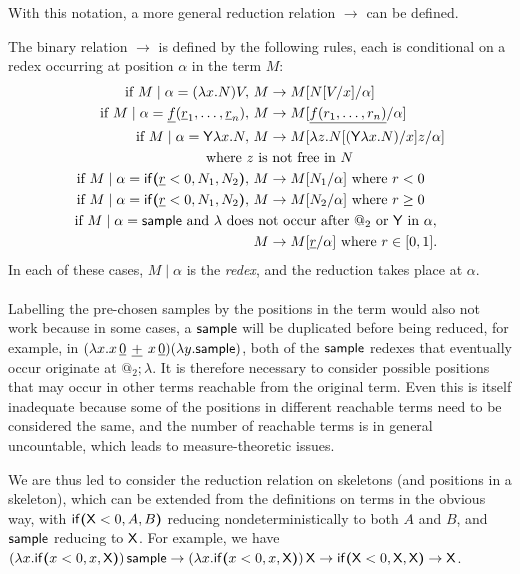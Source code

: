 With this notation, a more general reduction relation $\to$ can be defined.
\begin{definition}
\label{def:more general red}
The binary relation $\to$ is defined by the following rules, each is conditional on a redex occurring at position $\alpha$ in the term $M$:
\begin{align*}
  \text{if } M \mid \alpha = (\lambda x.N) V,\ & M \to M[N[V/x]/\alpha] \\
  \text{if } M \mid \alpha = \underline f (\underline r_1, \dots , \underline r_n),\ & M \to M[\underline{f(r_1,\dots,r_n)}/\alpha] \\
  \text{if } M \mid \alpha = \mathsf{Y} \lambda x. N,\ & M \to M[\lambda z. N[(\mathsf{Y} \lambda x. N)/x] z/\alpha]\\ \text{where }z&\text{ is not free in $N$}\\
  \text{if } M \mid \alpha = \mathsf{if}\boldsymbol{(}\underline r < 0, N_1, N_2\boldsymbol{)},\ & M \to M[N_1/\alpha] \text{ where }r < 0 \\
  \text{if } M \mid \alpha = \mathsf{if}\boldsymbol{(}\underline r < 0, N_1, N_2\boldsymbol{)},\ & M \to M[N_2/\alpha] \text{ where }r \geq 0 \\
  \text{if } M \mid \alpha = \mathsf{sample} \text{ and $\lambda$ does}&\text{ not occur after $@_2$ or $\mathsf{Y}$ in $\alpha$},\\ & M \to M[\underline r/\alpha] \text{ where } r \in [0,1].
\end{align*}
In each of these cases, $M \mid \alpha$ is the \emph{redex}, and the reduction takes place at $\alpha$.
\end{definition}

\paragraph{}
Labelling the pre-chosen samples by the positions in the term would also not work because in some cases, a $\mathsf{sample}$ will be duplicated before being reduced, for example, in $(\lambda x. x \, {\underline 0} \, \mathbin{\underline{+}} \, {x \, \underline 0}) (\lambda y. \mathsf{sample})$, both of the $\mathsf{sample}$ redexes that eventually occur originate at $@_2 ; \lambda$. 
It is therefore necessary to consider possible positions that may occur in other terms reachable from the original term. 
Even this is itself inadequate because some of the positions in different reachable terms need to be considered the same, and the number of reachable terms is in general uncountable, which leads to measure-theoretic issues.

We are thus led to consider the reduction relation on skeletons (and positions in a skeleton), which can be extended from the definitions on terms in the obvious way, with $\mathsf{if}\boldsymbol{(}\mathsf{X} < 0, A, B\boldsymbol{)}$ reducing nondeterministically to both $A$ and $B$, and $\mathsf{sample}$ reducing to $\mathsf{X}$.
For example, we have 
\(
(\lambda x . \mathsf{if}\boldsymbol{(}x < 0, x, \mathsf{X}\boldsymbol{)}) \, \mathsf{sample}
\to
(\lambda x . \mathsf{if}\boldsymbol{(}x < 0, x, \mathsf{X}\boldsymbol{)}) \, \mathsf{X}
\to
\mathsf{if}\boldsymbol{(}\mathsf{X} < 0, \mathsf{X}, \mathsf{X}\boldsymbol{)}
\to
\mathsf{X}
\).

